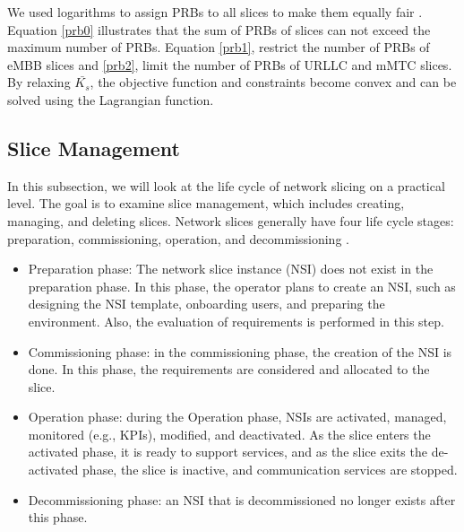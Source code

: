 \documentclass[lettersize,journal]{IEEEtran}
\begin{document}
We used logarithms to assign PRBs to all slices to make them equally fair \cite{marabissi2019highly}.
Equation \eqref{prb0} illustrates that the sum of PRBs of slices can not exceed the maximum number of PRBs.
Equation \eqref{prb1}, restrict the number of PRBs of eMBB slices and \eqref{prb2}, limit the number of PRBs of URLLC and mMTC slices. By relaxing $\bar{K_s}$, the objective function and constraints become convex and can be solved using the Lagrangian function.

\subsection{Slice Management}
In this subsection, we will look at the life cycle of network slicing on a practical level. 
The goal is to examine slice management, which includes creating, managing, and deleting slices. Network slices generally have four life cycle stages: preparation, commissioning, operation, and decommissioning \cite{ETSI2}.
\begin{itemize}
\item Preparation phase: The network slice instance (NSI) does not exist in the preparation phase. In this phase, the operator plans to create an NSI, such as designing the NSI template, onboarding users, and preparing the environment. Also, the evaluation of requirements is performed in this step.
\item Commissioning phase: in the commissioning phase, the creation of the NSI is done. In this phase, the requirements are considered and allocated to the slice.
\item Operation phase: during the Operation phase, NSIs are activated, managed, monitored (e.g., KPIs), modified, and deactivated. As the slice enters the activated phase, it is ready to support services, and as the slice exits the de-activated phase, the slice is inactive, and communication services are stopped.
\item Decommissioning phase: an NSI that is decommissioned no longer exists after this phase.
\end{itemize}
\end{document}
